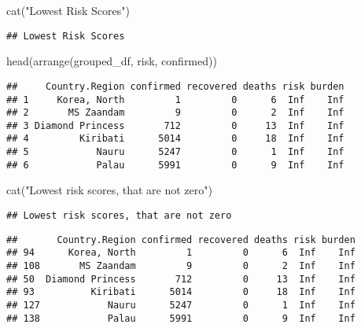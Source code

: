 \documentclass[
]{article}
\newenvironment{Shaded}{\begin{snugshade}}{\end{snugshade}}
\newcommand{\DecValTok}[1]{\textcolor[rgb]{0.00,0.00,0.81}{#1}}
\newcommand{\FunctionTok}[1]{\textcolor[rgb]{0.00,0.00,0.00}{#1}}
\newcommand{\NormalTok}[1]{#1}
\newcommand{\SpecialCharTok}[1]{\textcolor[rgb]{0.00,0.00,0.00}{#1}}
\newcommand{\StringTok}[1]{\textcolor[rgb]{0.31,0.60,0.02}{#1}}
\begin{document}
\begin{Shaded}
\begin{Highlighting}[]
\FunctionTok{cat}\NormalTok{(}\StringTok{"Lowest Risk Scores"}\NormalTok{)}
\end{Highlighting}
\end{Shaded}

\begin{verbatim}
## Lowest Risk Scores
\end{verbatim}

\begin{Shaded}
\begin{Highlighting}[]
\FunctionTok{head}\NormalTok{(}\FunctionTok{arrange}\NormalTok{(grouped\_df, risk, confirmed))}
\end{Highlighting}
\end{Shaded}

\begin{verbatim}
##     Country.Region confirmed recovered deaths risk burden
## 1     Korea, North         1         0      6  Inf    Inf
## 2       MS Zaandam         9         0      2  Inf    Inf
## 3 Diamond Princess       712         0     13  Inf    Inf
## 4         Kiribati      5014         0     18  Inf    Inf
## 5            Nauru      5247         0      1  Inf    Inf
## 6            Palau      5991         0      9  Inf    Inf
\end{verbatim}

\begin{Shaded}
\begin{Highlighting}[]
\FunctionTok{cat}\NormalTok{(}\StringTok{"Lowest risk scores, that are not zero"}\NormalTok{)}
\end{Highlighting}
\end{Shaded}

\begin{verbatim}
## Lowest risk scores, that are not zero
\end{verbatim}

\begin{Shaded}
\end{Shaded}

\begin{verbatim}
##       Country.Region confirmed recovered deaths risk burden
## 94      Korea, North         1         0      6  Inf    Inf
## 108       MS Zaandam         9         0      2  Inf    Inf
## 50  Diamond Princess       712         0     13  Inf    Inf
## 93          Kiribati      5014         0     18  Inf    Inf
## 127            Nauru      5247         0      1  Inf    Inf
## 138            Palau      5991         0      9  Inf    Inf
\end{verbatim}
\end{document}
